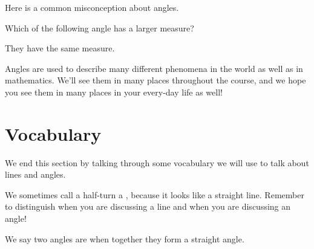 \documentclass{ximera}
\begin{document}
Here is a common misconception about angles.
\begin{question}
Which of the following angle has a larger measure?
\begin{center}
\end{center}

\begin{multipleChoice}
\choice[correct] They have the same measure.
\end{multipleChoice}
\end{question}

Angles are used to describe many different phenomena in the world as well as in mathematics. We'll see them in many places throughout the course, and we hope you see them in many places in your every-day life as well!

\section{Vocabulary}

We end this section by talking through some vocabulary we will use to talk about lines and angles.

We sometimes call a half-turn a , because it looks like a straight line. Remember to distinguish when you are discussing a line and when you are discussing an angle!
\begin{center}
\end{center}

We say two angles are  when together they form a straight angle. 
\begin{center}
\end{center}
\end{document}
